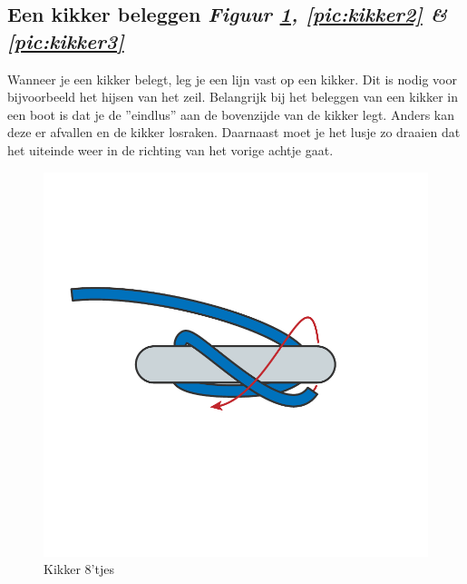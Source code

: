 \subsection{Een kikker beleggen \hfill \textit{Figuur \ref{pic:kikker1}, \ref{pic:kikker2} \& \ref{pic:kikker3}}}
Wanneer je een kikker belegt, leg je een lijn vast op een kikker. Dit is nodig voor bijvoorbeeld het hijsen van het zeil. Belangrijk bij het beleggen van een kikker in een boot is dat je de ''eindlus'' aan de bovenzijde van de kikker legt. Anders kan deze er afvallen en de kikker losraken. Daarnaast moet je het lusje zo draaien dat het uiteinde weer in de richting van het vorige achtje gaat.
\begin{figure}[h]
  \centering
  \begin{minipage}[b]{0.32\textwidth}
  \centering
    \includegraphics[width=\textwidth]{Hoofdstukken/Schiemannen/pdf/kikker1.pdf}
    \caption{Kikker 8'tjes}
    \label{pic:kikker1}
  \end{minipage}
  \hfill
  \begin{minipage}[b]{0.32\textwidth}
    \centering

\end{minipage}
\end{figure}
